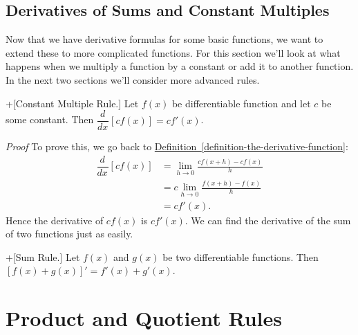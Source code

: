 \documentclass[10pt,]{book}
\makeatletter
\theoremstyle{ptxplainnotitle}
\theoremstyle{ptxplaintitle}
\theoremstyle{ptxplainnotitle}
\theoremstyle{ptxplaintitle}
\theoremstyle{ptxplainnotitle}
\theoremstyle{ptxplaintitle}
\renewcommand*{\proofname}{Proof}
\renewenvironment{proof}[1][\proofname]{\par
  \pushQED{\qed}%
  \normalfont \topsep6\p@\@plus6\p@\relax
  \trivlist
  \item\relax
    {\itshape
    #1\@addpunct{.}}\hspace\labelsep\ignorespaces
}{%
  \popQED\endtrivlist\@endpefalse
}
\theoremstyle{ptxdefinitionnotitle}
\theoremstyle{ptxdefinitiontitle}
\theoremstyle{ptxdefinitionnotitle}
\theoremstyle{ptxdefinitiontitle}
\theoremstyle{ptxdefinitionnotitle}
\theoremstyle{ptxdefinitiontitle}
\theoremstyle{ptxdefinitionnotitle}
\theoremstyle{ptxdefinitiontitle}
\theoremstyle{ptxdefinitionnotitle}
\theoremstyle{ptxdefinitiontitle}
\numberwithin{equation}{section}
\newcommand{\dv}[3][]{\dfrac{d^{#1} #2}{d #3^{#1}}}
\makeatother
\begin{document}
\subsection[{Derivatives of Sums and Constant Multiples}]{Derivatives of Sums and Constant Multiples}\label{subsection-derivatives-of-sums-and-constant-multiples}
\hypertarget{p-134}{}%
Now that we have derivative formulas for some basic functions, we want to extend these to more complicated functions. For this section we'll look at what happens when we multiply a function by a constant or add it to another function. In the next two sections we'll consider more advanced rules.%
\begin{theorem}+[{Constant Multiple Rule.}]\label{theorem-constant-multiple-rule}
\hypertarget{p-135}{}%
Let \(f(x)\) be differentiable function and let \(c\) be some constant. Then \(\dv{}{x}[cf(x)] = cf'(x)\).%
\end{theorem}
\begin{proof}\hypertarget{proof-2}{}
\hypertarget{p-136}{}%
To prove this, we go back to \hyperref[definition-the-derivative-function]{Definition~\ref{definition-the-derivative-function}}:%
\begin{align*}
\dv{}{x}[cf(x)] & = \lim_{h\to0}\frac{cf(x+h) - cf(x)}{h} \\
& = c\lim_{h\to0}\frac{f(x+h) - f(x)}{h} \\
& = cf'(x). 
\end{align*}
Hence the derivative of \(cf(x)\) is \(cf'(x)\).%
\end{proof}
\hypertarget{p-137}{}%
We can find the derivative of the sum of two functions just as easily.%
\begin{theorem}+[{Sum Rule.}]\label{theorem-sum-rule}
\hypertarget{p-138}{}%
Let \(f(x)\) and \(g(x)\) be two differentiable functions. Then \([f(x)+g(x)]' = f'(x) + g'(x)\).%
\end{theorem}
\typeout{************************************************}
\typeout{************************************************}
\section[{Product and Quotient Rules}]{Product and Quotient Rules}\label{section-product-and-quotient-rules}
\typeout{************************************************}
\typeout{************************************************}
\end{document}
